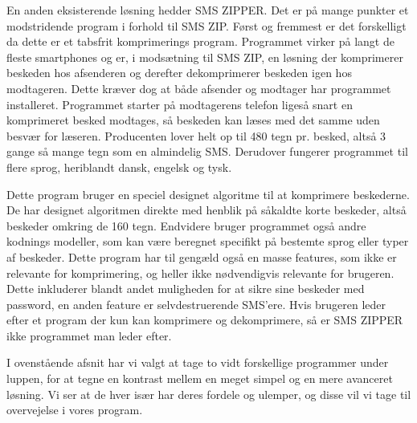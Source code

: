 En anden eksisterende løsning hedder SMS ZIPPER. Det er på mange punkter et modstridende program i forhold til SMS ZIP. Først og fremmest er det forskelligt da dette er et tabsfrit komprimerings program. Programmet virker på langt de fleste smartphones og er, i modsætning til SMS ZIP, en løsning der komprimerer beskeden hos afsenderen og derefter dekomprimerer beskeden igen hos modtageren. Dette kræver dog at både afsender og modtager har programmet installeret. Programmet starter på modtagerens telefon ligeså snart en komprimeret besked modtages, så beskeden kan læses med det samme uden besvær for læseren. Producenten lover helt op til 480 tegn pr. besked, altså 3 gange så mange tegn som en almindelig SMS. Derudover fungerer programmet til flere sprog, heriblandt dansk, engelsk og tysk.

Dette program bruger en speciel designet algoritme til at komprimere beskederne. De har designet algoritmen direkte med henblik på såkaldte korte beskeder, altså beskeder omkring de 160 tegn. Endvidere bruger programmet også andre kodnings modeller, som kan være beregnet specifikt på bestemte sprog eller typer af beskeder. Dette program har til gengæld også en masse features, som ikke er relevante for komprimering, og heller ikke nødvendigvis relevante for brugeren. Dette inkluderer blandt andet muligheden for at sikre sine beskeder med password, en anden feature er selvdestruerende SMS'ere. Hvis brugeren leder efter et program der kun kan komprimere og dekomprimere, så er SMS ZIPPER ikke programmet man leder efter.\cite{smszipper} 

I ovenstående afsnit har vi valgt at tage to vidt forskellige programmer under luppen, for at tegne en kontrast mellem en meget simpel og en mere avanceret løsning. Vi ser at de hver især har deres fordele og ulemper, og disse vil vi tage til overvejelse i vores program.